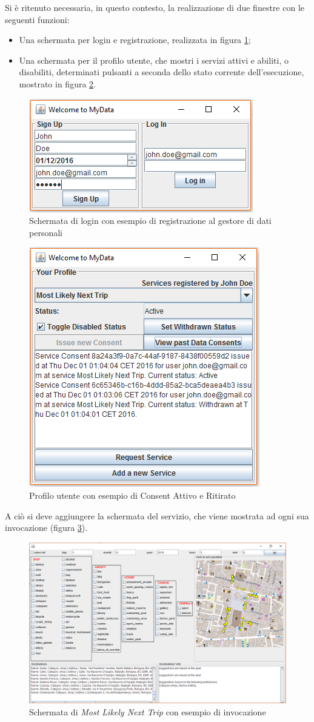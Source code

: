 Si \`e ritenuto necessaria, in questo contesto, la realizzazione di due finestre con le seguenti funzioni:
\begin{itemize}
	\item Una schermata per login e registrazione, realizzata in figura \ref{fig:welcomePanel};
	\item Una schermata per il profilo utente, che mostri i servizi attivi e abiliti, o disabiliti, determinati pulsanti a seconda dello stato corrente dell’esecuzione, mostrato in figura \ref{fig:exampleConsentInProj}.
\end{itemize}
\begin{figure}
	\centering
	\includegraphics[width=0.5\linewidth]{pictures/welcomePanel.png}
	\caption{Schermata di login con esempio di registrazione al gestore di dati personali}
	\label{fig:welcomePanel}
\end{figure}
\begin{figure}
	\centering
	\includegraphics[width=0.5\linewidth]{pictures/exampleConsentInProj.png}
	\caption{Profilo utente con esempio di Consent Attivo e Ritirato}
	\label{fig:exampleConsentInProj}
\end{figure}
A ci\`o si deve aggiungere la schermata del servizio, che viene mostrata ad ogni sua invocazione (figura \ref{fig:MLNTPanel}).
\begin{figure}
	\centering
	\includegraphics[width=0.85\linewidth]{pictures/MLNTPanel.png}
	\caption{Schermata di\textit{ Most Likely Next Trip} con esempio di invocazione}
	\label{fig:MLNTPanel}
\end{figure}

